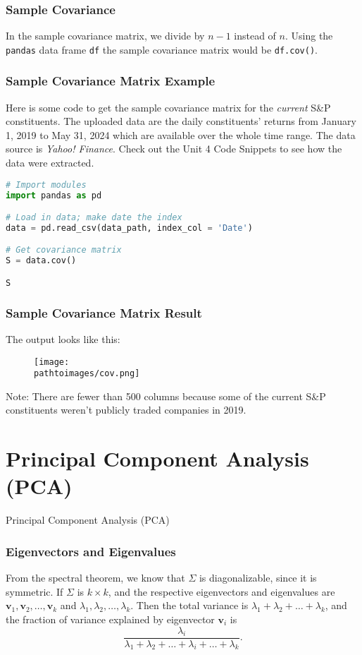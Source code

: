 \documentclass{beamer}
\newcommand{\pathtoimages}{/Users/charlesrambo/Desktop/Bootcamp24/Images}
\begin{document}
\begin{frame}
\frametitle{Sample Covariance}
In the sample covariance matrix, we divide by $n-1$ instead of $n$. Using the \texttt{pandas} data frame \texttt{df} the sample covariance matrix would be  \texttt{df.cov()}.

\end{frame}

\begin{frame}[fragile]
\frametitle{Sample Covariance Matrix Example}
\small 
Here is some code to get the sample covariance matrix for the {\it current} S\&P constituents. The uploaded data are the daily constituents' returns from January 1, 2019 to May 31, 2024 which are available over the whole time range. The data source is {\it Yahoo! Finance}. Check out the Unit 4 Code Snippets to see how the data were extracted.
\begin{lstlisting}[language=Python]
# Import modules
import pandas as pd

# Load in data; make date the index
data = pd.read_csv(data_path, index_col = 'Date')

# Get covariance matrix
S = data.cov()

S
\end{lstlisting}


\end{frame}

\begin{frame}
\frametitle{Sample Covariance Matrix Result}
The output looks like this:
\begin{figure}
\centering
\texttt{[image: \\pathtoimages/cov.png]}
\end{figure}
Note: There are fewer than 500 columns because some of the current S\&P constituents weren't publicly traded companies in 2019.
\end{frame}

\section{Principal Component Analysis (PCA)}


\begin{frame}
\begin{center}
\Huge Principal Component Analysis (PCA)
\end{center}
\end{frame}


\begin{frame}
\frametitle{Eigenvectors and Eigenvalues}
From the spectral theorem, we know that $\Sigma$ is diagonalizable, since it is symmetric. If $\Sigma$ is $k\times k$, and the respective eigenvectors and eigenvalues are ${\boldsymbol v_1}, {\boldsymbol v_2},\ldots, {\boldsymbol v_k}$ and $\lambda_1, \lambda_2,\ldots, \lambda_k$. Then the total variance is $\lambda_1 + \lambda_2+\ldots+\lambda_k$, and the fraction of variance explained by eigenvector ${\boldsymbol v_i}$ is
$$
\frac{\lambda_i}{\lambda_1 +\lambda_2+\ldots+\lambda_i+\ldots+\lambda_k}.
$$
\end{frame}
\end{document}
